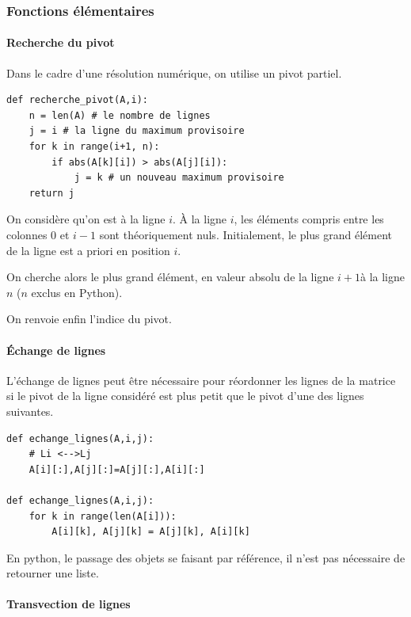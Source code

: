 \subsubsection{Fonctions élémentaires}
\paragraph*{Recherche du pivot}
Dans le cadre d'une résolution numérique, on utilise un pivot partiel. 

\begin{lstlisting}
def recherche_pivot(A,i):
    n = len(A) # le nombre de lignes
    j = i # la ligne du maximum provisoire
    for k in range(i+1, n):
        if abs(A[k][i]) > abs(A[j][i]):
            j = k # un nouveau maximum provisoire
    return j
\end{lstlisting}


On considère qu'on est à la ligne $i$. \`A la ligne $i$, les éléments compris entre les colonnes 0 et $i-1$ sont théoriquement nuls. Initialement, le plus grand élément de la ligne est a priori en position $i$. 

On cherche alors le plus grand élément, en valeur absolu de la ligne $i+1$à la ligne $n$ ($n$ exclus en Python). 

On renvoie enfin l'indice du pivot. 

\paragraph*{Échange de lignes}

L'échange de lignes peut être nécessaire pour réordonner les lignes de la matrice si le pivot de la ligne considéré est plus petit que le pivot d'une des lignes suivantes.  

\begin{lstlisting}
def echange_lignes(A,i,j):
    # Li <-->Lj
    A[i][:],A[j][:]=A[j][:],A[i][:]
    
def echange_lignes(A,i,j):
    for k in range(len(A[i])):
        A[i][k], A[j][k] = A[j][k], A[i][k]
\end{lstlisting}

\begin{remarque}
En python, le passage des objets se faisant par référence, il n'est pas nécessaire de retourner une liste. 
\end{remarque}

\paragraph*{Transvection de lignes}

